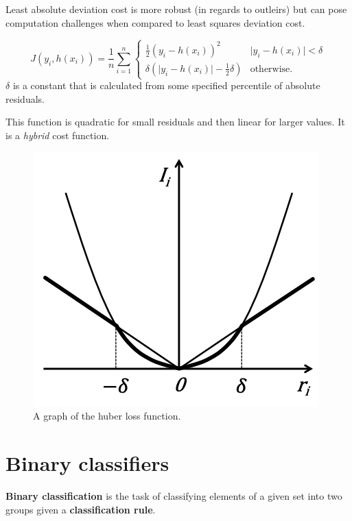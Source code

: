 Least absolute deviation cost is more robust (in regards to outleirs)
but can pose computation challenges when compared to least squares deviation
cost.

\begin{definition}
    \[
        J(y_i, h(x_i)) = \frac 1n \sum_{i = 1}^n
        \begin{cases}
            \frac12 (y_i - h(x_i))^2 & \lvert y_i - h(x_i) \rvert < \delta \\
            \delta (\lvert y_i - h(x_i) \rvert - \frac12 \delta) & \text{otherwise}.
        \end{cases}
    \]
    $\delta$ is a constant that is calculated from some specified 
    percentile of absolute residuals.
\end{definition}

This function is quadratic for small residuals and then linear for larger
values. It is a \emph{hybrid} cost function.

\begin{figure}[]
    \centering
    \includegraphics[width=0.8\linewidth]{images/huber-m}
    \caption{
        A graph of the huber loss function.
    }
    \label{fig:huber-m}
\end{figure}

\section{Binary classifiers}

\begin{definition}
    \textbf{Binary classification} is the task of classifying elements
    of a given set into two groups given a \textbf{classification rule}.
\end{definition}

